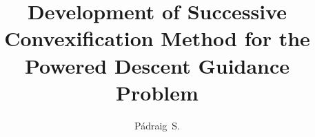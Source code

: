 \documentclass[defaultstyle,11pt]{thesis}
\title{Development of Successive Convexification Method for the Powered Descent Guidance Problem}
\author{Pádraig~S.}{Lysandrou}
\begin{document}




\nocite{*}		%

\appendix


\end{document}
